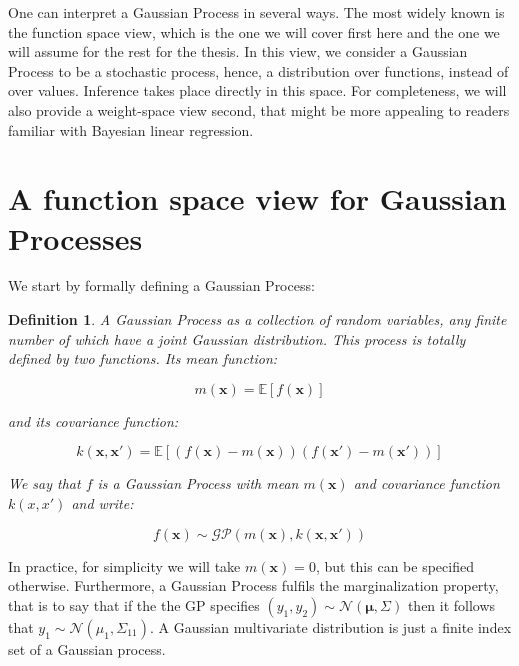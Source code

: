 \documentclass[10pt,a4paper,twoside]{book}
\newtheorem{defini}{Definition}
\begin{document}
One can interpret a Gaussian Process in several ways. The most widely known is the function space view, which is the one we will cover first here and the one we will assume for the rest for the thesis. In this view, we consider a Gaussian Process to be a stochastic process, hence, a distribution over functions, instead of over values. Inference takes place directly in this space. For completeness, we will also provide a weight-space view second, that might be more appealing to readers familiar with Bayesian linear regression.\\



\section{A function space view for Gaussian Processes}

We start by formally defining a Gaussian Process:

\begin{defini}
A Gaussian Process as a collection of random variables, any finite number of which have a joint Gaussian distribution. This process is totally defined by two functions. Its \textit{mean function}:

\begin{equation}
m(\boldsymbol{x}) = \mathbb{E}\left[f(\boldsymbol{x})\right]
\end{equation} 

and its \textit{covariance function}:

\begin{equation}
k(\boldsymbol{x}, \boldsymbol{x'}) = \mathbb{E}\left[\left( f(\boldsymbol{x}) - m(\boldsymbol{x}) \right)\left( f(\boldsymbol{x}') - m(\boldsymbol{x}')\right)\right]
\end{equation}


We say that $f$ is a Gaussian Process with mean $m(\boldsymbol{x})$ and covariance function $k(x, x')$ and write:

\begin{equation}
f(\boldsymbol{x}) \sim \mathcal{GP}\left(m(\boldsymbol{x}), k(\boldsymbol{x}, \boldsymbol{x'}) \right)
\end{equation}
\end{defini}

In practice, for simplicity we will take $m(\boldsymbol{x}) = 0$, but this can be specified otherwise. Furthermore, a Gaussian Process fulfils the marginalization property, that is to say that if the the GP specifies $(y_1, y_2) \sim \mathcal{N}(\boldsymbol{\mu}, \Sigma)$ then it follows that $y_1 \sim \mathcal{N}(\mu_1, \Sigma_{11})$. A Gaussian multivariate distribution is just a finite index set of a Gaussian process. \\
\end{document}
